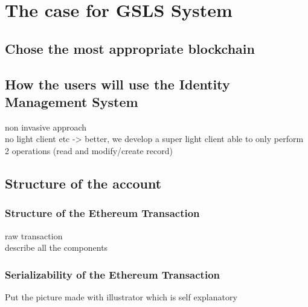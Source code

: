 \section{The case for GSLS System}
\label{S:3}

\subsection{Chose the most appropriate blockchain}



\subsection{How the users will use the Identity Management System}
non invasive approach\\
no light client etc -> better, we develop a super light client able to only perform 2 operations (read and modify/create record)


\subsection{Structure of the account}

\subsubsection{Structure of the Ethereum Transaction}

raw transaction\\

describe all the components

\subsubsection{Serializability of the Ethereum Transaction}

Put the picture made with illustrator which is self explanatory